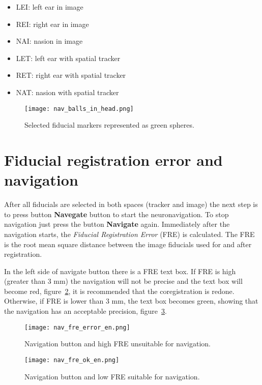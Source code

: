 \begin{itemize}
	\item LEI: left ear in image
	\item REI: right ear in image
	\item NAI: nasion in image
	\item LET: left ear with spatial tracker
	\item RET: right ear with spatial tracker
	\item NAT: nasion with spatial tracker
\end{itemize}

\begin{figure}[!htb]
\centering
\texttt{[image: nav\_balls\_in\_head.png]}
\caption{Selected fiducial markers represented as green spheres.}
\label{fig:nav_balls_in_head}
\end{figure}


\section{Fiducial registration error and navigation}

After all fiducials are selected in both spaces (tracker and image) the next step is to press button \textbf{Navegate}
button to start the neuronavigation. To stop navigation just press the button \textbf{Navigate} again.
Immediately after the navigation starts, the  \textit{Fiducial Registration Error} (FRE) is calculated. The FRE is the
root mean square distance between the image fiducials used for and after registration.

In the left side of navigate button there is a FRE text box. If FRE is high (greater than 3 mm) the navigation will not
be precise and the text box will become red, figure~\ref{fig:nav_fre_error}, it is recommended that the coregistration
is redone. Otherwise, if FRE is lower than 3 mm, the text box becomes green, showing that the navigation has an
acceptable precision, figure~\ref{fig:nav_fre_ok}.

\begin{figure}[!htb]
\centering
\texttt{[image: nav\_fre\_error\_en.png]}
\caption{Navigation button and high FRE unsuitable for navigation.}
\label{fig:nav_fre_error}
\end{figure}

\begin{figure}[!htb]
\centering
\texttt{[image: nav\_fre\_ok\_en.png]}
\caption{Navigation button and low FRE suitable for navigation.}
\label{fig:nav_fre_ok}
\end{figure}

